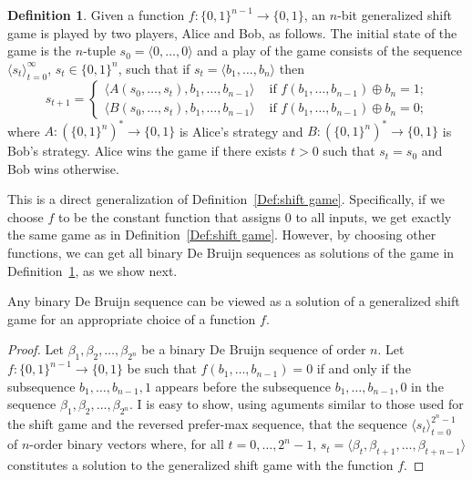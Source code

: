 \documentclass[final,12pt]{elsarticle}
\theoremstyle{definition} \newtheorem{definition}[theorem]{Definition} \newtheorem{observation}[theorem]{Observation} \newtheorem{example}[theorem]{Example} \newtheorem{remark}[theorem]{Remark} \newtheorem{corrolary}[theorem]{Corrolary}
\newcommand{\REF}[2]{#1~\ref{#2}}
\newcommand{\T}[1]{\langle{#1}\rangle} \DeclareMathOperator{\drop}{drop} \DeclareMathOperator{\dropbits}{drop\_bits} \DeclareMathOperator{\dropstates}{drop\_states} \DeclareMathOperator{\leadingForm}{LeadingForm} \DeclareMathOperator{\dv}{div} %
\begin{document}
\begin{definition}
	\label{Def:generalized-shift game} Given a function $f\colon \{0,1\}^{n-1} \to \{0,1\}$, an $n$-bit generalized shift game is played by two players, Alice and Bob, as follows. The initial state of the game is the $n$-tuple $s_0=
		\T{0,\dots,0}$ and a play of the game consists of the sequence $
		\T{s_t }_{t=0}^\infty$, $s_t \in \{0,1\}^n$, such that if $s_t=
		\T{b_1, \dots, b_n}$ then $$s_{t+1} =
		\begin{cases}
			\T{ A(s_0,\dots,s_t), b_1, \dots, b_{n-1}} & \text{ if $f(b_1,\dots,b_{n-1}) \oplus b_n = 1$;} \\
			\T{ B(s_0,\dots,s_t), b_1, \dots, b_{n-1}} & \text{ if $f(b_1,\dots,b_{n-1}) \oplus b_n = 0$;}
		\end{cases}
	$$ where $A\colon(\{0,1\}^n)^* \to \{0,1\}$ is Alice's strategy and $B\colon (\{0,1\}^n)^* \to \{0,1\}$ is Bob's strategy. Alice wins the game if there exists $t>0$ such that $s_t=s_0$ and Bob wins otherwise.
\end{definition}




This is a direct generalization of \REF{Definition}{Def:shift game}. Specifically, if we choose $f$ to be the constant function that assigns 0 to all inputs, we get exactly the same game as in \REF{Definition}{Def:shift game}. However, by choosing other functions, we can get all binary De Bruijn sequences as solutions of the game in \REF{Definition}{Def:generalized-shift game}, as we show next.

\begin{proposition}
	Any binary De Bruijn sequence can be viewed as a solution of a generalized shift game for an appropriate choice of a function $f$.
\end{proposition}
\begin{proof}
	Let $\beta_1, \beta_2, \dots, \beta_{2^n}$ be a binary De Bruijn sequence of order $n$. Let $f\colon \{0,1\}^{n-1} \to \{0,1\}$ be such that $f(b_1,\dots,b_{n-1})=0$ if and only if the subsequence $b_1,\dots,b_{n-1},1$ appears before the subsequence $b_1,\dots,b_{n-1},0$ in the sequence $\beta_1, \beta_2, \dots, \beta_{2^n}$. I is easy to show, using aguments similar to those used for the shift game and the reversed prefer-max sequence, that the sequence $ \T{s_t}_{t=0}^{2^n-1}$ of $n$-order binary vectors where, for all $t=0,\dots,2^n-1$, $s_t=\T{\beta_t, \beta_{t+1}, \dots,\beta_{t+n-1}}$ constitutes a solution to the generalized shift game with the function $f$.
\end{proof}
\end{document}
